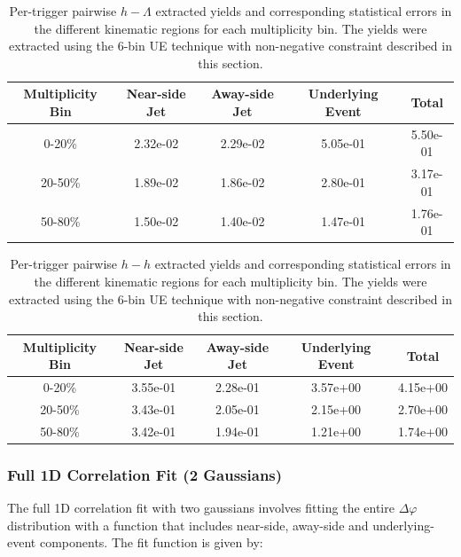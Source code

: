 \documentclass[ALICE,manyauthors]{ALICE_analysis_notes}
\begin{document}
	
\begin{table}[h!]
\centering
\begin{tabular}{| c | c | c | c | c | }
\hline
Multiplicity Bin & Near-side Jet & Away-side Jet & Underlying Event & Total  \\
\hline
	
0-20\% & 2.32e-02  & 2.29e-02  & 5.05e-01 & 5.50e-01 \\
20-50\% & 1.89e-02 & 1.86e-02  & 2.80e-01 & 3.17e-01 \\
50-80\% & 1.50e-02 & 1.40e-02  & 1.47e-01 & 1.76e-01 \\
	
\hline
\end{tabular}
\caption{Per-trigger pairwise $h-\Lambda$ extracted yields and corresponding statistical errors in the different kinematic regions for each multiplicity bin. The yields were extracted using the 6-bin UE technique with non-negative constraint described in this section.}
\label{h_lambda_yield_table_6bin_nonzero}
\end{table}
	
\begin{table}[h!]
\centering
\begin{tabular}{| c | c | c | c | c | }
\hline
Multiplicity Bin & Near-side Jet & Away-side Jet & Underlying Event & Total  \\
\hline

0-20\% & 3.55e-01  & 2.28e-01  & 3.57e+00 & 4.15e+00 \\
20-50\% & 3.43e-01 & 2.05e-01  & 2.15e+00 & 2.70e+00 \\
50-80\% & 3.42e-01 & 1.94e-01  & 1.21e+00 & 1.74e+00 \\

\hline
\end{tabular}
\caption{Per-trigger pairwise $h-h$ extracted yields and corresponding statistical errors in the different kinematic regions for each multiplicity bin. The yields were extracted using the 6-bin UE technique with non-negative constraint described in this section.}
\label{h_h_yield_table_6bin_nonzero}
\end{table}

\clearpage

\subsubsection{Full 1D Correlation Fit (2 Gaussians)}
\label{full_correlation_fit}
The full 1D correlation fit with two gaussians involves fitting the entire $\Delta\varphi$ distribution with a function that includes near-side, away-side and underlying-event components. The fit function is given by:
\end{document}
